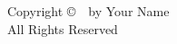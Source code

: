 \thispagestyle{empty}
\vspace*{\fill}
\begin{center}
    \large
    Copyright \copyright\ \the\year\ by Your Name\\
    All Rights Reserved
\end{center}
\vspace*{\fill}
\clearpage 
